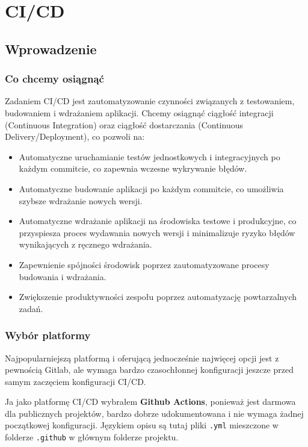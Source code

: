 \documentclass{article}
\begin{document}
\section{CI/CD} \label{sectionCICD}

\subsection{Wprowadzenie}

\subsubsection{Co chcemy osiągnąć}

Zadaniem CI/CD jest zautomatyzowanie czynności związanych z testowaniem, budowaniem i wdrażaniem aplikacji. Chcemy osiągnąć ciągłość integracji (Continuous Integration) oraz ciągłość dostarczania (Continuous Delivery/Deployment), co pozwoli na:

\begin{itemize}
\item Automatyczne uruchamianie testów jednostkowych i integracyjnych po każdym commitcie, co zapewnia wczesne wykrywanie błędów.
\item Automatyczne budowanie aplikacji po każdym commitcie, co umożliwia szybsze wdrażanie nowych wersji.
\item Automatyczne wdrażanie aplikacji na środowiska testowe i produkcyjne, co przyspiesza proces wydawania nowych wersji i minimalizuje ryzyko błędów wynikających z ręcznego wdrażania.
\item Zapewnienie spójności środowisk poprzez zautomatyzowane procesy budowania i wdrażania.
\item Zwiększenie produktywności zespołu poprzez automatyzację powtarzalnych zadań.
\end{itemize}

\subsubsection{Wybór platformy}

Najpopularniejszą platformą i oferującą jednocześnie najwięcej opcji jest z pewnością Gitlab, ale wymaga bardzo czasochłonnej konfiguracji jeszcze przed samym zaczęciem konfiguracji CI/CD.

Ja jako platformę CI/CD wybrałem \textbf{Github Actions}, ponieważ jest darmowa dla publicznych projektów, bardzo dobrze udokumentowana i nie wymaga żadnej początkowej konfiguracji. Językiem opisu są tutaj pliki \lstinline|.yml| mieszczone w folderze \lstinline|.github| w głównym folderze projektu.
\end{document}
